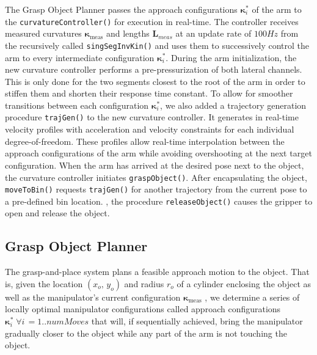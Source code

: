 The Grasp Object Planner passes the approach configurations $\boldsymbol{\kappa}_i^*$ of the arm to the \texttt{curvatureController()} for execution in real-time.
The controller receives measured curvatures $\boldsymbol{\kappa}_{\textrm{meas}}$ and lengths $\mathbf{L}_{meas}$ at an update rate of $100\unit{Hz}$ from the recursively called \texttt{singSegInvKin()} and uses them to successively control the arm to every intermediate configuration $\boldsymbol{\kappa}_i^*$.
During the arm initialization, the new curvature controller performs a pre-pressurization of both lateral channels. 
This is only done for the two segments closest to the root of the arm in order to stiffen them and shorten their response time constant.  
To allow for smoother transitions between each configuration $\boldsymbol{\kappa}_i^*$, we also added a trajectory generation procedure \texttt{trajGen()} to the new curvature controller. It generates in real-time velocity profiles with acceleration and velocity constraints for each individual degree-of-freedom.
These profiles allow real-time interpolation between the approach configurations of the arm while avoiding overshooting at the next target configuration.
When the arm has arrived at the desired pose next to the object, the curvature controller initiates \texttt{graspObject()}.
After encapsulating the object, \texttt{moveToBin()} requests \texttt{trajGen()} for another trajectory from the current pose to a pre-defined bin location.
, the procedure \texttt{releaseObject()} causes the gripper to open and release the object.

\subsection{Grasp Object Planner}
\label{subsec:grasp_planner}
The grasp-and-place system plans a feasible approach motion to the object.
That is, given the location $\left(x_o, \, y_o\right)$ and radius $r_o$ of a cylinder enclosing the object as well as the manipulator's current configuration $\boldsymbol{\kappa}_{\textrm{meas}}$ , we determine a series of locally optimal manipulator configurations called approach configurations $\boldsymbol{\kappa}_i^* \; \forall i \, = 1.. numMoves$ that will, if sequentially achieved, bring the manipulator gradually closer to the object while any part of the arm is not touching the object.

